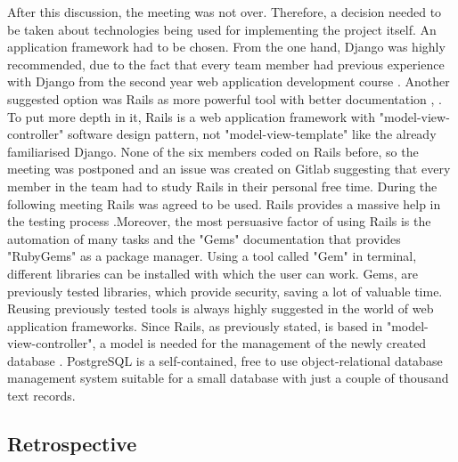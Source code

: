 \documentclass{l3proj}
\begin{document}
After this discussion, the meeting was not over. Therefore, a decision needed to be taken about technologies being used for implementing the project itself. An application framework had to be chosen. From the one hand, Django was highly recommended, due to the fact that every team member had previous experience with Django from the second year web application development course \cite{Django}. Another suggested option was Rails as more powerful tool with better documentation \cite{Rails}, \cite{DjangoVsRails} . To put more depth in it, Rails is a web application framework with "model-view-controller" software design pattern, not "model-view-template" like the already familiarised Django. None of the six members coded on Rails before, so the meeting was postponed and an issue was created on Gitlab suggesting that every member in the team had to study Rails in their personal free time. During the following meeting Rails was agreed to be used. Rails provides a massive help in the testing process \cite{RubyGem} .Moreover, the most persuasive factor of using Rails is the automation of many tasks and the "Gems" documentation that provides "RubyGems" as a package manager. Using a tool called "Gem" in  terminal, different libraries can be installed with which the user can work. Gems, are previously tested libraries, which provide security, saving a lot of valuable time. Reusing previously tested tools is always highly suggested in the world of web application frameworks. Since Rails, as previously stated, is based in "model-view-controller", a model is needed for the management of the newly created database \cite{PostgreSQL}. PostgreSQL is a self-contained, free to use object-relational database management system suitable for a small database with just a couple of thousand text records.
\subsection{Retrospective}
\label{retrospective}
\end{document}
